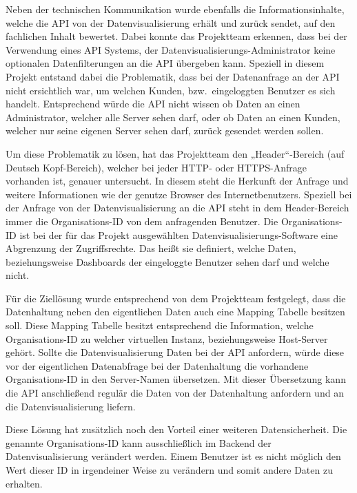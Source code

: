 {Neben der technischen Kommunikation wurde ebenfalls die Informationsinhalte,
welche die API von der Datenvisualisierung erhält und zurück sendet, auf den
fachlichen Inhalt bewertet. Dabei konnte das Projektteam erkennen, dass bei der
Verwendung eines API Systems, der Datenvisualisierungs\hyp{}Administrator keine
optionalen Datenfilterungen an die API übergeben kann. Speziell in diesem
Projekt entstand dabei die Problematik, dass bei der Datenanfrage an der API
nicht ersichtlich war, um welchen Kunden, bzw.\ eingeloggten Benutzer es sich
handelt. Entsprechend würde die API nicht wissen ob Daten an einen
Administrator, welcher alle Server sehen darf, oder ob Daten an einen Kunden,
welcher nur seine eigenen Server sehen darf, zurück gesendet werden sollen.

Um diese Problematik zu lösen, hat das Projektteam den „Header“\hyp{}Bereich
(auf Deutsch Kopf\hyp{}Bereich), welcher bei jeder \gls{HTTP}- oder
\gls{HTTPS}\hyp{}Anfrage vorhanden ist, genauer untersucht. In diesem steht die
Herkunft der Anfrage und weitere Informationen wie der genutze Browser des
Internetbenutzers. Speziell bei der Anfrage von der Datenvisualisierung an die
API steht in dem Header\hyp{}Bereich immer die Organisations\hyp{}ID von dem
anfragenden Benutzer. Die Organisations\hyp{}ID ist bei der für das Projekt
ausgewählten Datenvisualisierungs\hyp{}Software eine Abgrenzung der
Zugriffsrechte. Das heißt sie definiert, welche Daten, beziehungsweise
Dashboards der eingeloggte Benutzer sehen darf und welche nicht.

Für die Ziellösung wurde entsprechend von dem Projektteam festgelegt, dass die
Datenhaltung neben den eigentlichen Daten auch eine Mapping Tabelle besitzen
soll. Diese Mapping Tabelle besitzt entsprechend die Information, welche
Organisations\hyp{}ID zu welcher virtuellen Instanz, beziehungsweise
Host\hyp{}Server gehört. Sollte die Datenvisualisierung Daten bei der API
anfordern, würde diese vor der eigentlichen Datenabfrage bei der Datenhaltung
die vorhandene Organisations\hyp{}ID in den Server\hyp{}Namen übersetzen. Mit
dieser Übersetzung kann die API anschließend regulär die Daten von der
Datenhaltung anfordern und an die Datenvisualisierung liefern.

Diese Lösung hat zusätzlich noch den Vorteil einer weiteren Datensicherheit.
Die genannte Organisations\hyp{}ID kann ausschließlich im Backend der
Datenvisualisierung verändert werden. Einem Benutzer ist es nicht möglich den
Wert dieser ID in irgendeiner Weise zu verändern und somit andere Daten zu
erhalten.
\nl%

}
